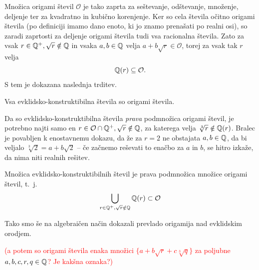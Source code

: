 Množica origami števil $\mathcal{O}$ je tako zaprta za seštevanje, odštevanje, množenje, deljenje ter za kvadratno in kubično korenjenje. Ker so cela števila očitno origami števila (po definiciji imamo dano enoto, ki jo znamo prenašati po realni osi), so zaradi zaprtosti za deljenje origami števila tudi vsa racionalna števila. Zato za vsak $r \in \mathbb Q^+, \sqrt{r} \notin \mathbb Q$ in vsaka $a, b \in \mathbb Q$ velja $a + b\sqrt{r} \in \mathcal{O}$, torej za vsak tak $r$ velja
$$ \mathbb Q(r) \subseteq \mathcal{O}. $$
S tem je dokazana naslednja trditev.

\begin{trditev}
    Vsa evklidsko-konstruktibilna števila so origami števila.
\end{trditev}

Da so evklidsko-konstruktibilna števila \emph{prava} podmnožica origami števil, je potrebno najti samo en $r \in \mathcal{O} \cap \mathbb Q^+, \sqrt{r} \notin \mathbb Q$, za katerega velja $\sqrt[3]{r} \notin \mathbb Q(r)$. Bralec je povabljen k enostavnemu dokazu, da že za $r = 2$ ne obstajata $a, b \in \mathbb Q$, da bi veljalo $\sqrt[3]{2} = a + b\sqrt{2}$ -- če začnemo reševati to enačbo za $a$ in $b$, se hitro izkaže, da nima niti realnih rešitev.

\begin{izrek}
    Množica evklidsko-konstruktibilnih števil je prava podmnožica množice origami števil, t.\ j.
    $$ \bigcup_{r \in \mathbb Q^+, \sqrt{r} \notin \mathbb Q} \mathbb Q(r) \subset \mathcal{O} $$
\end{izrek}

Tako smo še na algebraičen način dokazali prevlado origamija nad evklidskim orodjem.

\textcolor{red}{(a potem so origami števila enaka množici $\{ a + b \sqrt{r} + c \sqrt[3]{q} \}$ za poljubne $a, b, c, r, q \in \mathbb Q$? Je kakšna oznaka?)}